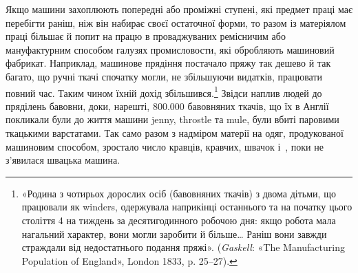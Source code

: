 Якщо машини захоплюють попередні або проміжні ступені,
які предмет праці має перебігти раніш, ніж він набирає своєї
остаточної форми, то разом із матеріялом праці більшає й попит
на працю в проваджуваних ремісничим або мануфактурним способом
галузях промисловости, які обробляють машиновий
фабрикат. Наприклад, машинове прядіння постачало пряжу так
дешево й так багато, що ручні ткачі спочатку могли, не збільшуючи
видатків, працювати повний час. Таким чином їхній дохід
збільшився.\footnote{
«Родина з чотирьох дорослих осіб (бавовняних ткачів) з двома
дітьми, що працювали як winders, одержувала наприкінці останнього та
на початку цього століття 4 на тиждень за десятигодинного
робочою дня: якщо робота мала нагальний характер, вони могли
заробити й більше\dots{} Раніш вони завжди страждали від недостатнього
подання пряжі». (\emph{Gaskell}: «The Manufacturing Population of England»,
London 1833, p. 25--27).
} Звідси наплив людей до пряділень бавовни,
доки, нарешті, \num{800.000} бавовняних ткачів, що їх в Англії покликали
були до життя машини jenny, throstle та mule, були
вбиті паровими ткацькими варстатами. Так само разом з надміром
матерії на одяг, продукованої машиновим способом, зростало
число кравців, кравчих, швачок і~, поки не з’явилася
швацька машина.
